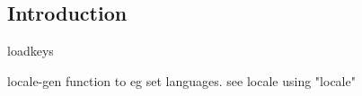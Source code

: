 
\subsection{Introduction}

loadkeys


locale-gen function to eg set languages. see locale using "locale"